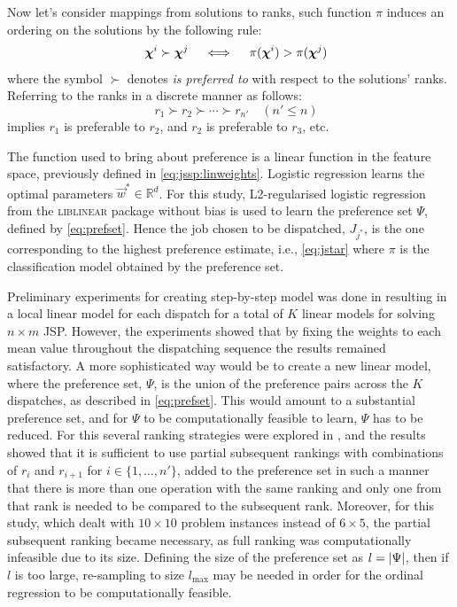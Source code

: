 \documentclass[twocolumn]{svjour3}
\begin{document}
Now let's consider mappings from solutions to ranks, such 
function $\pi$ induces an ordering on the solutions by the following rule:
\begin{equation}\quad
\bm \chi^i \succ \bm \chi^j \quad \iff \quad \pi(\bm \chi^i) > 
\pi(\bm \chi^j)
\end{equation}
where the symbol $\succ$ denotes \emph{is preferred to} with respect to the 
solutions' ranks. Referring to the ranks in a discrete  manner as follows:
\begin{equation}\quad\label{eq:rankorder}
r_1 \succ r_2 \succ \cdots \succ r_{n'} \quad (n' \leq n)
\end{equation}
implies $r_1$ is preferable to $r_2$, and $r_2$ is preferable to $r_3$, etc. 

The function used to bring about preference is a linear function in the feature 
space, previously defined in \cref{eq:jssp:linweights}.
Logistic regression learns the optimal parameters $\vec{w}^*\in\mathbb{R}^d$. 
For this study, L2-regularised logistic regression from the \textsc{liblinear} 
package \cite{liblinear} without bias is used to learn the preference set 
$\Psi$, defined by \cref{eq:prefset}.
Hence the job chosen to be dispatched, $J_{j^*}$, is the one corresponding to 
the highest preference estimate, i.e., \cref{eq:jstar} where $\pi$ is 
the classification model obtained by the preference set.

Preliminary experiments for creating step-by-step model was done in 
\cite{InRu11a} resulting in a local linear model for each dispatch for a total 
of $K$ linear models for solving $n\times m$ JSP. 
However, the experiments showed that by fixing the weights to each mean 
value throughout the dispatching sequence the results remained satisfactory.
A more sophisticated way would be to create a new linear model, where 
the preference set, $\Psi$, is the union of the preference pairs across the 
$K$ dispatches, as described in \cref{eq:prefset}. 
This would amount to a substantial preference set, and for $\Psi$ to be 
computationally feasible to learn, $\Psi$ has to be reduced. For this several 
ranking strategies were explored in \cite{InRu15a}, and the results showed 
that it is sufficient to use partial subsequent rankings with combinations 
of $r_i$ and $r_{i+1}$ for $i\in\{1,\ldots,n'\}$, added to the preference 
set in such a manner that there is more than one 
operation with the same ranking and only one from that rank is needed to be 
compared to the subsequent rank. 
Moreover, for this study, which dealt with $10\times 10$ problem instances 
instead of $6\times5$, the partial subsequent ranking became necessary, as 
full ranking was computationally infeasible due to its size. 
Defining the size of the preference set as $l=\lvert\Psi\rvert$, then if $l$ is too 
large, re-sampling to size $l_{\max}$ may be needed in order for the 
ordinal regression to be computationally feasible. 
\end{document}
